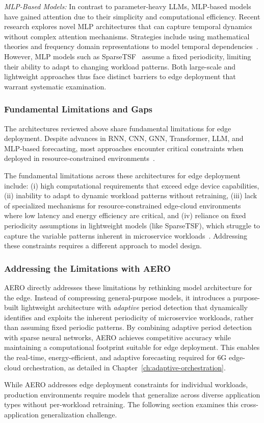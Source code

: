 \textit{\ac{MLP}-Based Models:} In contrast to parameter-heavy \acp{LLM}, \ac{MLP}-based models~\cite{zeng2023koopa, wu2023timemlp, liu2023fits} have gained attention due to their simplicity and computational efficiency. Recent research explores novel \ac{MLP} architectures that can capture temporal dynamics without complex attention mechanisms. Strategies include using mathematical theories and frequency domain representations to model temporal dependencies~\cite{zhou2023patchTST}. However, \ac{MLP} models such as \ac{SparseTSF}~\cite{sparseTSF} assume a fixed periodicity, limiting their ability to adapt to changing workload patterns. Both large-scale and lightweight approaches thus face distinct barriers to edge deployment that warrant systematic examination.

\subsubsection{Fundamental Limitations and Gaps}

The architectures reviewed above share fundamental limitations for edge deployment. Despite advances in \ac{RNN}, \ac{CNN}, \ac{GNN}, Transformer, \ac{LLM}, and \ac{MLP}-based forecasting, most approaches encounter critical constraints when deployed in resource-constrained environments~\cite{acmtimeseriesreview2024}.

The fundamental limitations across these architectures for edge deployment include: (i) high computational requirements that exceed edge device capabilities, (ii) inability to adapt to dynamic workload patterns without retraining, (iii) lack of specialized mechanisms for resource-constrained edge-cloud environments where low latency and energy efficiency are critical, and (iv) reliance on fixed periodicity assumptions in lightweight models (like \ac{SparseTSF}), which struggle to capture the variable patterns inherent in microservice workloads~\cite{10202641}. Addressing these constraints requires a different approach to model design.

\subsubsection{Addressing the Limitations with AERO}

\ac{AERO} directly addresses these limitations by rethinking model architecture for the edge. Instead of compressing general-purpose models, it introduces a purpose-built lightweight architecture with \textit{adaptive} period detection that dynamically identifies and exploits the inherent periodicity of microservice workloads, rather than assuming fixed periodic patterns. By combining adaptive period detection with sparse neural networks, \ac{AERO} achieves competitive accuracy while maintaining a computational footprint suitable for edge deployment. This enables the real-time, energy-efficient, and adaptive forecasting required for \ac{6G} edge-cloud orchestration, as detailed in Chapter~\ref{ch:adaptive-orchestration}.

While \ac{AERO} addresses edge deployment constraints for individual workloads, production environments require models that generalize across diverse application types without per-workload retraining. The following section examines this cross-application generalization challenge.


